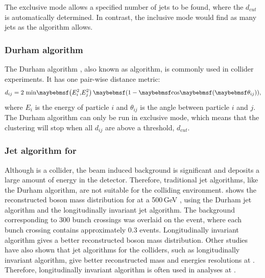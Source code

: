 The exclusive mode allows a specified number of jets to be found, where the $d_{cut}$ is automatically determined. In contrast, the inclusive mode would find as many jets as the algorithm allows.


\subsubsection{Durham algorithm}
\label{sec:pandoraJetDurham}
The Durham algorithm \cite{Catani:1991hj}, also known as \ee \kt algorithm, is commonly used in \ee collider experiments. It has one pair-wise distance metric:
\begin{equation}
d_{ij} = 2\,\min\!\parenths{E_i^2,\!E_j^2}\,\parenths{1 - \cosOf{\theta_{ij}}},
\end{equation}
where $E_i$ is the energy of particle $i$ and $\theta_{ij}$ is the angle between particle $i$ and $j$. The Durham algorithm can only be run in exclusive mode, which means that the clustering will stop when all $d_{ij}$ are above a threshold, $d_{cut}$.




\subsubsection{Jet algorithm for \CLIC}

Although \CLIC is a \ee collider, the  beam induced background is significant and deposits a large amount of energy in the detector. Therefore, traditional \ee jet algorithms, like the Durham algorithm, are not suitable for the \CLIC colliding environment.  shows the reconstructed \PZ boson mass distribution for  at a 500\,GeV \CLIC \cite{Boronat:2014hva}, using the Durham jet algorithm and the longitudinally invariant \kt jet algorithm. The \ggHad background corresponding to 300 bunch crossings was overlaid on the event, where each bunch crossing contains approximately 0.3 \ggHad events. Longitudinally invariant \kt algorithm gives a better  reconstructed \PZ boson mass distribution. Other studies \cite{Linssen:2012hp,LCD-Note-2010-006} have also shown that jet algorithms for the \pp colliders, such as  longitudinally invariant \kt algorithm,  give better reconstructed mass and energies resolutions at \CLIC. Therefore, longitudinally invariant \kt algorithm is often used in analyses at \CLIC.

